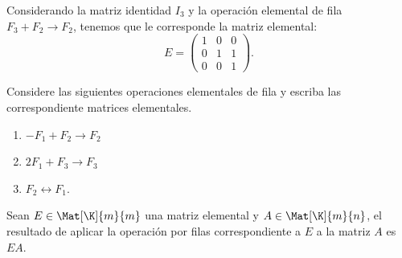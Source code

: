 \documentclass[compacto,10pt]{pubciencias-notas}
\begin{document}
\begin{ejem}\label{ejem2}
Considerando la matriz identidad $I_{3}$ y la operación elemental de fila $F_3+F_2\rightarrow F_2$, tenemos que le corresponde la matriz elemental:
\[
    E=\begin{pmatrix}1&0&0\\0&1&1\\0&0&1\end{pmatrix}.
\]
\end{ejem}

\begin{ejer}\hspace{0pt} Considere las siguientes operaciones elementales de fila y escriba las correspondiente matrices elementales.
\begin{enumerate}
    \item $-F_1+F_2\rightarrow F_2$
    \item $2F_1+F_3\rightarrow F_3$
    \item $F_2\longleftrightarrow F_1$.
\end{enumerate}
\end{ejer}

\begin{teo}
    Sean $E\in \Mat[\K]{m}{m}$ una matriz elemental y $A\in\Mat[\K]{m}{n}$, el resultado de aplicar la operación por filas correspondiente a $E$ a la matriz $A$ es $EA$.
\end{teo}
\end{document}
